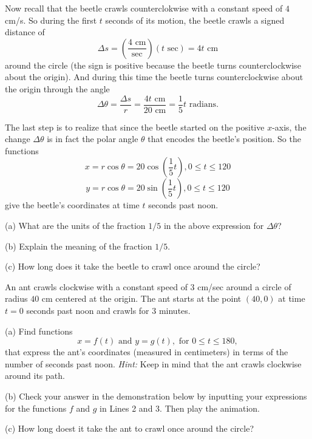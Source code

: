 \documentclass{ximera}
\begin{document}
Now recall that the beetle crawls counterclokwise with a constant speed of $4$ cm/s.  So during the first $t$ seconds of its motion, the beetle crawls a signed distance of
\[
   \Delta  s = \left( \frac{4 \text{ cm}}{\text{sec}} \right) (t \text{ sec}) = 4t \text{ cm}  
\]
around the circle (the sign is positive because the beetle turns counterclockwise about the origin). And during this time the beetle turns counterclockwise about the origin through the angle
\[
    \Delta \theta = \frac{\Delta s}{r} = \frac{4t \text{ cm}}{20 \text{ cm}} = \frac{1}{5}t \text{ radians}.
\]

The last step is to realize that since the beetle started on the positive $x$-axis, the change $\Delta \theta$  is in fact the polar angle $\theta$ that encodes the beetle's position. So the functions
\[
    x = r\cos \theta = 20 \cos \left( \frac{1}{5}t \right) , 0\leq t \leq 120
\]
\[
    y = r\cos \theta = 20 \sin \left( \frac{1}{5}t \right) , 0\leq t \leq 120
\]
give the beetle's coordinates at time $t$ seconds past noon.


\begin{question}  \label{Qgf45365:Motion1}
(a) What are the units of the fraction $1/5$ in the above expression for $\Delta \theta$?

(b) Explain the meaning of the fraction $1/5$.

(c) How long does it take the beetle to crawl once around the circle?
\end{question}


\begin{question}  \label{Q345tds5:Motion1}
An ant crawls clockwise with a constant speed of $3$ cm/sec around a circle of radius $40$ cm centered at the origin. The ant starts at the point $(40,0)$ at time $t=0$ seconds past noon and crawls for $3$ minutes.

(a) Find functions
\[
   x = f(t) \text{ and } y=g(t) , \text{ for } 0\leq t \leq 180 ,
\]
that express the ant's coordinates (measured in centimeters) in terms of the number of seconds past noon. {\it Hint:} Keep in mind that the ant crawls clockwise around its path.

(b) Check your answer in the demonstration below by inputting your expressions for the functions $f$ and $g$ in Lines 2 and 3. Then play the animation.

(c) How long doest it take the ant to crawl once around the circle?

 
\begin{onlineOnly}
    \begin{center}
\end{center}
\end{onlineOnly}


\end{question}
\end{document}
